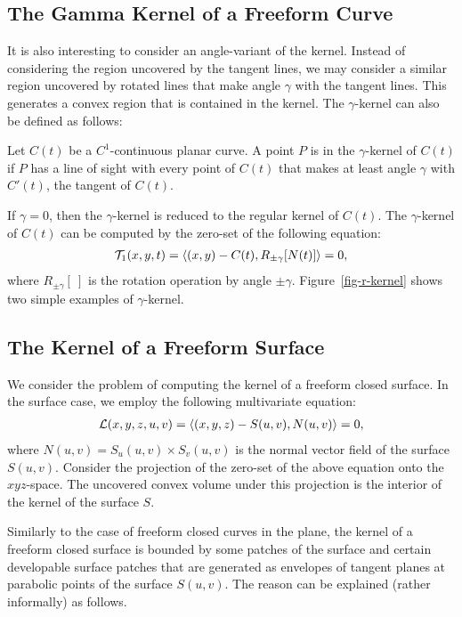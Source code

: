 \documentclass{acmsiggraph}
\begin{document}
\subsection{The Gamma Kernel of a Freeform Curve}
\label{subsec-gamma-kernel-curve}

It is also interesting to consider an angle-variant of the kernel.
Instead of considering the region uncovered by the tangent lines,
we may consider a similar region uncovered by rotated lines
that make angle $\gamma$ with the tangent lines.
This generates a convex region that is contained in the kernel.
The $\gamma$-kernel can also be defined as follows:

\begin{definitionenv}
Let $C(t)$ be a $C^1$-continuous planar curve.  A point $P$ is
in the $\gamma$-kernel of $C(t)$ if $P$ has a line of sight with every point 
of $C(t)$ that makes at least angle $\gamma$ with $C'(t)$,
the tangent of $C(t)$.
\end{definitionenv}
If $\gamma = 0$, then the $\gamma$-kernel is reduced to the regular kernel 
of $C(t)$. The $\gamma$-kernel of $C(t)$ can be computed by the zero-set 
of the following equation:
\begin{eqnarray*}
{\cal T}_1(x, y, t) = \left<{(x,y) - C(t)}, {R_{\pm\gamma} [N(t)]} \right> = 0, 
\end{eqnarray*}
where $R_{\pm\gamma} [\ ]$ is the rotation operation by angle $\pm\gamma$.
Figure~\ref{fig-r-kernel} shows two simple examples of $\gamma$-kernel.




\subsection{The Kernel of a Freeform Surface}
\label{subsec-kernel-surface}

We consider the problem of computing the kernel of a freeform closed surface.
In the surface case, we employ the following multivariate equation:
\begin{eqnarray}
{\cal L}(x,y,z,u,v) = \left<{(x,y,z) - S(u,v)}, {N(u,v)} \right> = 0,
\label{eqn-kernel-srf}
\end{eqnarray}
where $N(u,v) = S_u(u,v) \times S_v(u,v)$ is the normal vector field of the 
surface $S(u,v)$.   Consider the projection of the zero-set of
the above equation onto the $xyz$-space.
The uncovered convex volume under this projection is
the interior of the kernel of the surface $S$.

Similarly to the case of freeform closed curves in the plane,
the kernel of a freeform closed surface is bounded
by some patches of the surface and 
certain developable surface patches that are generated as
envelopes of tangent planes at parabolic points of the surface $S(u,v)$.
The reason can be explained (rather informally) as follows.
\end{document}
